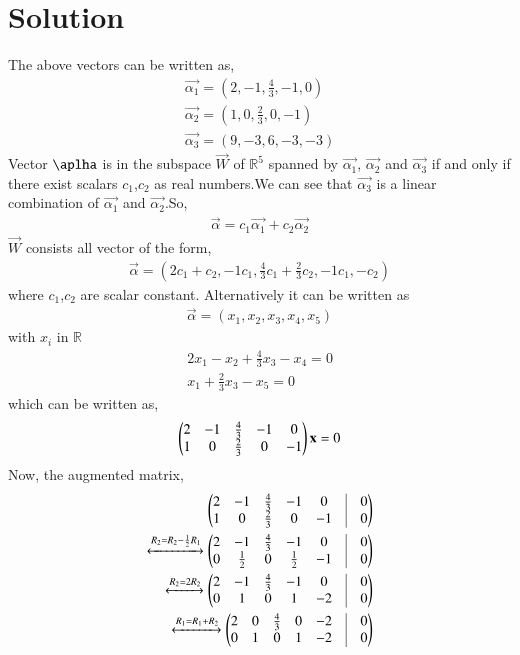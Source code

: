 \documentclass[journal,12pt,twocolumn]{IEEEtran}
\begin{document}
   \section{\textbf{Solution}}
   The above vectors can be written as,
   \begin{align}
   \vec{\alpha_1}=(2,-1,\frac{4}{3},-1,0)\\
   \vec{\alpha_2}=(1,0,\frac{2}{3},0,-1)\\
   \vec{\alpha_3}=(9,-3,6,-3,-3)
   \end{align}
   Vector $\aplha$ is in the subspace $\vec{W}$ of $\mathbb{R}^5$ spanned by $\vec{\alpha_1}$, $\vec{\alpha_2}$ and $ \vec{\alpha_3}$ if and only if there exist scalars $c_1$,$c_2$ as real numbers.We can see that $\vec{\alpha_3}$ is a linear combination of $\vec{\alpha_1}$ and $\vec{\alpha_2}$.So,
    \begin{align}
   \vec{\alpha}=c_1\vec{\alpha_1}+c_2\vec{\alpha_2}
   \end{align}
   $\vec{W}$ consists all vector of the form,
   \begin{align}
   \vec{\alpha}=(2c_1+c_2,-1c_1,\frac{4}{3}c_1+\frac{2}{3}c_2,-1c_1,-c_2)
   \end{align}
   where $c_1$,$c_2$  are scalar constant. Alternatively it can be written as
   \begin{align}
   \vec{\alpha}=(x_1,x_2,x_3,x_4,x_5)\label{alpha}
   \end{align}
   with $x_i$ in $\mathbb{R}$
   \begin{align}
   2x_1-x_2+\frac{4}{3}x_3-x_4=0\\
   x_1+\frac{2}{3}x_3-x_5=0
   \end{align}
   which can be written as,
   \begin{align}
  \begin{pmatrix}2&-1&\frac{4}{3}&-1&0\\1&0&\frac{2}{3}&0&-1\end{pmatrix}\mathbf{x}=0
   \end{align}
   Now, the augmented matrix,
   \begin{align}
     \myvec{2&-1&\frac{4}{3}&-1&0&\vrule&0\\1&0&\frac{2}{3}&0&-1&\vrule& 0}\\
     \xleftrightarrow{R_2=R_2-\frac{1}{2}R_1}\myvec{2&-1&\frac{4}{3}&-1&0&\vrule&0\\0&\frac{1}{2}&0&\frac{1}{2}&-1&\vrule& 0}\\
      \xleftrightarrow{R_2=2R_2}\myvec{2&-1&\frac{4}{3}&-1&0&\vrule&0\\0&1&0&1&-2&\vrule& 0}\\
      \xleftrightarrow{R_1=R_1+R_2}\myvec{2&0&\frac{4}{3}&0&-2&\vrule&0\\0&1&0&1&-2&\vrule& 0}
\end{align}
\end{document}
